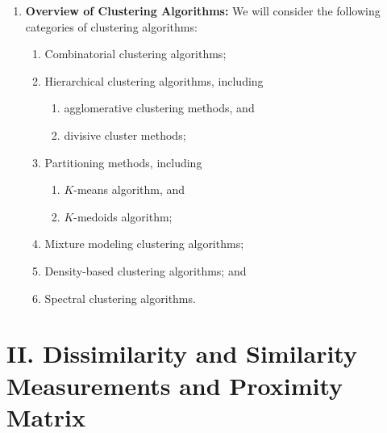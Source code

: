 \documentclass[12pt]{article}
\begin{document}
\begin{enumerate}[label=\textbf{\arabic*.}]
	\item \textbf{Overview of Clustering Algorithms:} We will consider the following categories of clustering algorithms: 
	\begin{enumerate}
		\item Combinatorial clustering algorithms; 
		\item Hierarchical clustering algorithms, including 
		\begin{enumerate}
			\item agglomerative clustering methods, and 
			\item divisive cluster methods; 
		\end{enumerate}
		\item Partitioning methods, including 
		\begin{enumerate}
			\item $K$-means algorithm, and 
			\item $K$-medoids algorithm; 
		\end{enumerate}
		\item Mixture modeling clustering algorithms; 
		\item Density-based clustering algorithms; and 
		\item Spectral clustering algorithms. 
	\end{enumerate}

\end{enumerate}


\section*{II. Dissimilarity and Similarity Measurements and Proximity Matrix}
\end{document}
